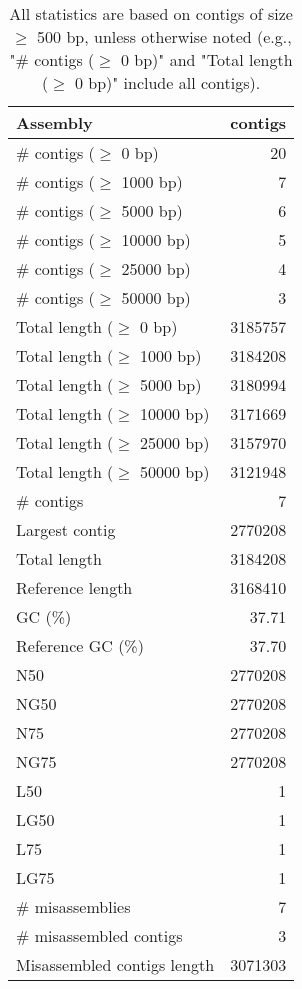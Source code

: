 \documentclass[12pt,a4paper]{article}
\begin{document}
\begin{table}[ht]
\begin{center}
\caption{All statistics are based on contigs of size $\geq$ 500 bp, unless otherwise noted (e.g., "\# contigs ($\geq$ 0 bp)" and "Total length ($\geq$ 0 bp)" include all contigs).}
\begin{tabular}{|l*{1}{|r}|}
\hline
Assembly & contigs \\ \hline
\# contigs ($\geq$ 0 bp) & 20 \\ \hline
\# contigs ($\geq$ 1000 bp) & 7 \\ \hline
\# contigs ($\geq$ 5000 bp) & 6 \\ \hline
\# contigs ($\geq$ 10000 bp) & 5 \\ \hline
\# contigs ($\geq$ 25000 bp) & 4 \\ \hline
\# contigs ($\geq$ 50000 bp) & 3 \\ \hline
Total length ($\geq$ 0 bp) & 3185757 \\ \hline
Total length ($\geq$ 1000 bp) & 3184208 \\ \hline
Total length ($\geq$ 5000 bp) & 3180994 \\ \hline
Total length ($\geq$ 10000 bp) & 3171669 \\ \hline
Total length ($\geq$ 25000 bp) & 3157970 \\ \hline
Total length ($\geq$ 50000 bp) & 3121948 \\ \hline
\# contigs & 7 \\ \hline
Largest contig & 2770208 \\ \hline
Total length & 3184208 \\ \hline
Reference length & 3168410 \\ \hline
GC (\%) & 37.71 \\ \hline
Reference GC (\%) & 37.70 \\ \hline
N50 & 2770208 \\ \hline
NG50 & 2770208 \\ \hline
N75 & 2770208 \\ \hline
NG75 & 2770208 \\ \hline
L50 & 1 \\ \hline
LG50 & 1 \\ \hline
L75 & 1 \\ \hline
LG75 & 1 \\ \hline
\# misassemblies & 7 \\ \hline
\# misassembled contigs & 3 \\ \hline
Misassembled contigs length & 3071303 \\ \hline

\end{tabular}
\end{center}
\end{table}
\end{document}
